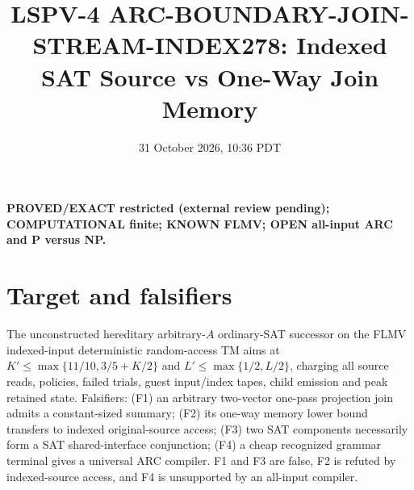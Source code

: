 \documentclass[11pt]{article}
\title{LSPV-4 ARC-BOUNDARY-JOIN-STREAM-INDEX278: Indexed SAT Source vs One-Way Join Memory}
\date{31 October 2026, 10:36 PDT}
\begin{document}
\maketitle
\noindent\textbf{PROVED/EXACT restricted (external review pending); COMPUTATIONAL finite; KNOWN FLMV; OPEN all-input ARC and P versus NP.}
\section{Target and falsifiers}
The unconstructed hereditary arbitrary-$A$ ordinary-SAT successor on the FLMV indexed-input deterministic random-access TM aims at $K'\le\max\{11/10,3/5+K/2\}$ and $L'\le\max\{1/2,L/2\}$, charging all source reads, policies, failed trials, guest input/index tapes, child emission and peak retained state. Falsifiers: (F1) an arbitrary two-vector one-pass projection join admits a constant-sized summary; (F2) its one-way memory lower bound transfers to indexed original-source access; (F3) two SAT components necessarily form a SAT shared-interface conjunction; (F4) a cheap recognized grammar terminal gives a universal ARC compiler. F1 and F3 are false, F2 is refuted by indexed-source access, and F4 is unsupported by an all-input compiler.
\end{document}
